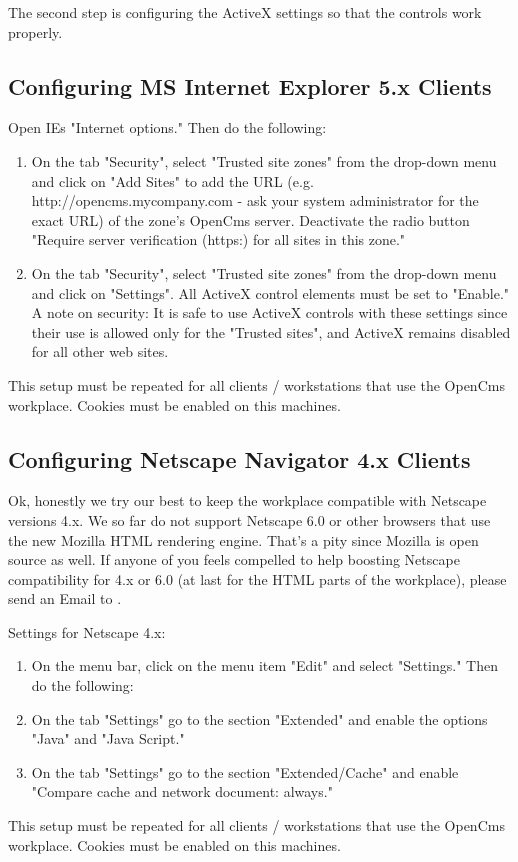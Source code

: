 The second step is configuring the ActiveX settings so that the
controls work properly.


\subsection{Configuring MS Internet Explorer 5.x Clients}

Open IEs "Internet options." Then do the following:

\begin{enumerate}
\item On the tab "Security", select "Trusted site zones" from the
drop-down menu and click on "Add Sites" to add the URL (e.g.
http://opencms.mycompany.com - ask your system administrator for
the exact URL) of the zone's OpenCms server. Deactivate the radio
button "Require server verification (https:) for all sites in this
zone."
\item On the tab "Security", select "Trusted site zones"
from the drop-down menu and click on "Settings". All ActiveX
control elements must be set to "Enable." A note on security: It
is safe to use ActiveX controls with these settings since their
use is allowed only for the "Trusted sites", and ActiveX remains
disabled for all other web sites.
\end{enumerate}

This setup must be repeated for all clients / workstations that
use the OpenCms workplace. Cookies must be enabled on this
machines.


\subsection{Configuring Netscape Navigator 4.x Clients}

Ok, honestly we try our best to keep the workplace compatible with
Netscape versions 4.x. We so far do not support Netscape 6.0 or
other browsers that use the new Mozilla HTML rendering engine.
That's a pity since Mozilla is open source as well. If anyone of
you feels compelled to help boosting Netscape compatibility for
4.x or 6.0 (at last for the HTML parts of the workplace), please
send an Email to
.

Settings for Netscape 4.x:
\begin{enumerate}
\item On the menu bar, click on the menu item "Edit" and select
"Settings." Then do the following:
\item On the tab "Settings" go
to the section "Extended" and enable the options "Java" and "Java
Script."
\item On the tab "Settings" go to the section
"Extended/Cache" and enable "Compare cache and network document:
always."
\end{enumerate}

This setup must be repeated for all clients / workstations that
use the OpenCms workplace. Cookies must be enabled on this
machines.

